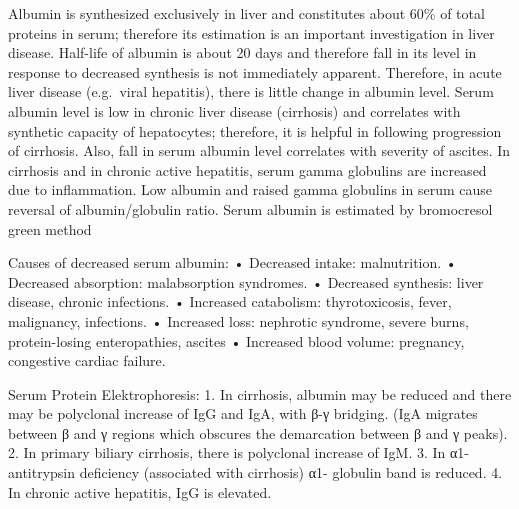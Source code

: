 \documentclass[
  letterpaper,
  DIV=11,
  numbers=noendperiod]{scrreprt}
\begin{document}
Albumin is synthesized exclusively in liver and constitutes about 60\%
of total proteins in serum; therefore its estimation is an important
investigation in liver disease. Half-life of albumin is about 20 days
and therefore fall in its level in response to decreased synthesis is
not immediately apparent. Therefore, in acute liver disease (e.g.~viral
hepatitis), there is little change in albumin level. Serum albumin level
is low in chronic liver disease (cirrhosis) and correlates with
synthetic capacity of hepatocytes; therefore, it is helpful in following
progression of cirrhosis. Also, fall in serum albumin level correlates
with severity of ascites. In cirrhosis and in chronic active hepatitis,
serum gamma globulins are increased due to inflammation. Low albumin and
raised gamma globulins in serum cause reversal of albumin/globulin
ratio. Serum albumin is estimated by bromocresol green method

Causes of decreased serum albumin: • Decreased intake: malnutrition. •
Decreased absorption: malabsorption syndromes. • Decreased synthesis:
liver disease, chronic infections. • Increased catabolism:
thyrotoxicosis, fever, malignancy, infections. • Increased loss:
nephrotic syndrome, severe burns, protein-losing enteropathies, ascites
• Increased blood volume: pregnancy, congestive cardiac failure.

Serum Protein Elektrophoresis: 1. In cirrhosis, albumin may be reduced
and there may be polyclonal increase of IgG and IgA, with β-γ bridging.
(IgA migrates between β and γ regions which obscures the demarcation
between β and γ peaks). 2. In primary biliary cirrhosis, there is
polyclonal increase of IgM. 3. In α1-antitrypsin deficiency (associated
with cirrhosis) α1- globulin band is reduced. 4. In chronic active
hepatitis, IgG is elevated.
\end{document}
